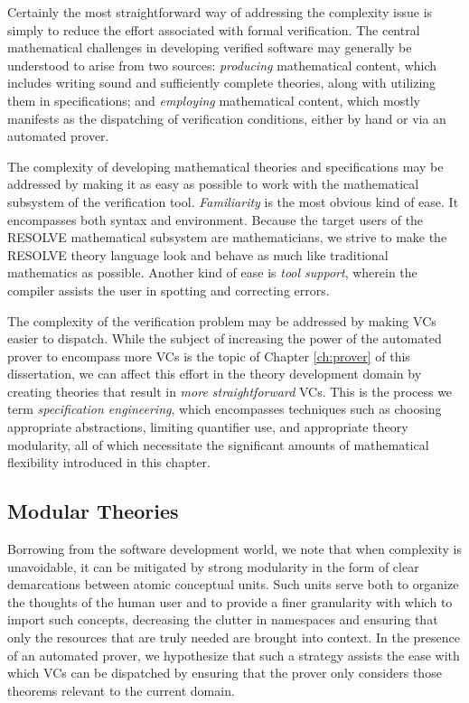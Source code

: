 Certainly the most straightforward way of addressing the complexity issue is simply to reduce the effort associated with formal verification.  The central mathematical challenges in developing verified software may generally be understood to arise from two sources: \emph{producing} mathematical content, which includes writing sound and sufficiently complete theories, along with utilizing them in specifications; and \emph{employing} mathematical content, which mostly manifests as the dispatching of verification conditions, either by hand or via an automated prover.

The complexity of developing mathematical theories and specifications may be addressed by making it as easy as possible to work with the mathematical subsystem of the verification tool.  \emph{Familiarity} is the most obvious kind of ease.  It encompasses both syntax and environment.  Because the target users of the RESOLVE mathematical subsystem are mathematicians, we strive to make the RESOLVE theory language look and behave as much like traditional mathematics as possible.  Another kind of ease is \emph{tool support}, wherein the compiler assists the user in spotting and correcting errors.

The complexity of the verification problem may be addressed by making VCs easier to dispatch.  While the subject of increasing the power of the automated prover to encompass more VCs is the topic of Chapter \ref{ch:prover} of this dissertation, we can affect this effort in the theory development domain by creating theories that result in \emph{more straightforward} VCs.  This is the process we term \emph{specification engineering}, which encompasses techniques such as choosing appropriate abstractions, limiting quantifier use, and appropriate theory modularity, all of which necessitate the significant amounts of mathematical flexibility introduced in this chapter.

	\subsection{Modular Theories\label{modularTheories}}

Borrowing from the software development world, we note that when complexity is unavoidable, it can be mitigated by strong modularity in the form of clear demarcations between atomic conceptual units.   Such units serve both to organize the thoughts of the human user and to provide a finer granularity with which to import such concepts, decreasing the clutter in namespaces and ensuring that only the resources that are truly needed are brought into context.  In the presence of an automated prover, we hypothesize that such a strategy assists the ease with which VCs can be dispatched by ensuring that the prover only considers those theorems relevant to the current domain.


